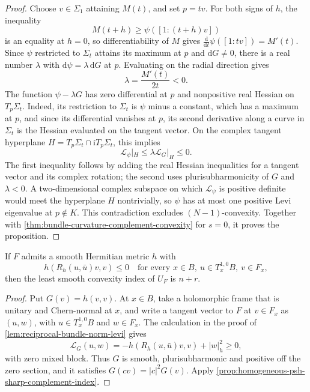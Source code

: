\begin{proof}
Choose $v\in\Sigma_1$ attaining $M(t)$, and set $p=tv$. For both signs of $h$, the inequality
\[
 M(t+h)\geq\psi([1:(t+h)v])
\]
is an equality at $h=0$, so differentiability of $M$ gives $\frac{\mathrm d}{\mathrm dt}\psi([1:tv])=M'(t)$. Since $\psi$ restricted to $\Sigma_t$ attains its maximum at $p$ and $\mathrm dG\ne0$, there is a real number $\lambda$ with $\mathrm d\psi=\lambda\,\mathrm dG$ at $p$. Evaluating on the radial direction gives
\[
 \lambda=\frac{M'(t)}{2t}<0.
\]
The function $\psi-\lambda G$ has zero differential at $p$ and nonpositive real Hessian on $T_p\Sigma_t$. Indeed, its restriction to $\Sigma_t$ is $\psi$ minus a constant, which has a maximum at $p$, and since its differential vanishes at $p$, its second derivative along a curve in $\Sigma_t$ is the Hessian evaluated on the tangent vector. On the complex tangent hyperplane $H=T_p\Sigma_t\cap\mathrm iT_p\Sigma_t$, this implies
\[
 \mathcal L_\psi|_H\leq\lambda\mathcal L_G|_H\leq0.
\]
The first inequality follows by adding the real Hessian inequalities for a tangent vector and its complex rotation; the second uses plurisubharmonicity of $G$ and $\lambda<0$. A two-dimensional complex subspace on which $\mathcal L_\psi$ is positive definite would meet the hyperplane $H$ nontrivially, so $\psi$ has at most one positive Levi eigenvalue at $p\notin K$. This contradiction excludes $(N-1)$-convexity. Together with \cref{thm:bundle-curvature-complement-convexity} for $s=0$, it proves the proposition.
\end{proof}

\begin{corollary}\label{cor:griffiths-nonpositive-exact-complement-index}
If $F$ admits a smooth Hermitian metric $h$ with
\[
 h(R_h(u,\bar u)v,v)\leq0
 \quad\text{for every }x\in B,\ u\in T_x^{1,0}B,\ v\in F_x,
\]
then the least smooth convexity index of $U_F$ is $n+r$.
\end{corollary}
\begin{proof}
Put $G(v)=h(v,v)$. At $x\in B$, take a holomorphic frame that is unitary and Chern-normal at $x$, and write a tangent vector to $F$ at $v\in F_x$ as $(u,w)$, with $u\in T_x^{1,0}B$ and $w\in F_x$. The calculation in the proof of \cref{lem:reciprocal-bundle-norm-levi} gives
\[
 \mathcal L_G(u,w)=-h(R_h(u,\bar u)v,v)+|w|_h^2\geq0,
\]
with zero mixed block. Thus $G$ is smooth, plurisubharmonic and positive off the zero section, and it satisfies $G(cv)=|c|^2G(v)$. Apply \cref{prop:homogeneous-psh-sharp-complement-index}.
\end{proof}

